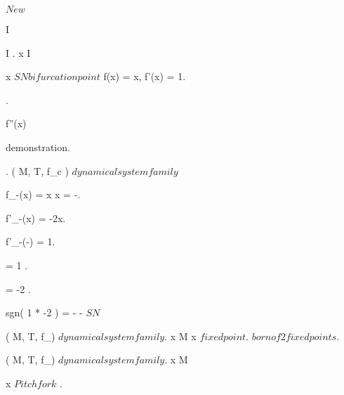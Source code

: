 \documentclass[../Main/main]{subfiles}
\begin{document}
\unit{ $ New $ }
{
	
	
	
	
	
	
	
	
	
	
	
	
	
	
	
	
	
	
	
	
	
	
	
	{
		{
			I \subset \R
		}
		{
		}
	}
	
	
	{
		{
			I \subset \R
			.
			x \in I
		}
		\holds
		{
			x $ SN bifurcation point $ \ifandonlyif f(x) = x, f'(x) = 1.

			 .

			f''(x) 
		}
		\demonstration
		{
			demonstration.
		}
	}
	
	
	
	{
		{
			.
			( M, T, f_c ) $ dynamical system family $
		}
		{
			f_{-}(x) = x \ifandonlyif x = -.

			f'_{-}(x) = -2x.

			f'_{-}(-) = 1.

			 = 1 .

			 = -2 .

			sgn( 1 * -2 ) = - \imp - $ SN $
		}
	}
	
	
	{
		{
			( M, T, f_\lambda ) $ dynamical system family $.
			x \in M
		}
		{
			x $ fixed point $.
			$ born of 2 fixed points $.
		}
	}
	
	
	{
		{
			( M, T, f_\lambda ) $ dynamical system family $.
			x \in M
		}
		\holds
		{
			x $ Pitchfork $ \ifandonlyif.

}}}
\end{document}

